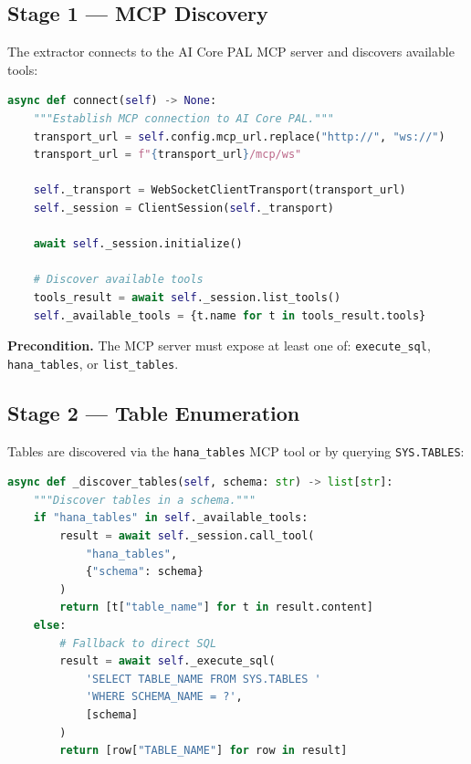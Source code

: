 \documentclass[11pt,a4paper]{article}
\begin{document}
\subsection{Stage 1 --- MCP Discovery}

The extractor connects to the AI Core PAL MCP server and discovers available tools:

\begin{lstlisting}[language=Python,caption={MCP connection (hana\_schema\_extractor.py, lines 45--60)}]
async def connect(self) -> None:
    """Establish MCP connection to AI Core PAL."""
    transport_url = self.config.mcp_url.replace("http://", "ws://")
    transport_url = f"{transport_url}/mcp/ws"
    
    self._transport = WebSocketClientTransport(transport_url)
    self._session = ClientSession(self._transport)
    
    await self._session.initialize()
    
    # Discover available tools
    tools_result = await self._session.list_tools()
    self._available_tools = {t.name for t in tools_result.tools}
\end{lstlisting}

\textbf{Precondition.} The MCP server must expose at least one of: \texttt{execute\_sql},
\texttt{hana\_tables}, or \texttt{list\_tables}.

\subsection{Stage 2 --- Table Enumeration}

Tables are discovered via the \texttt{hana\_tables} MCP tool or by querying
\texttt{SYS.TABLES}:

\begin{lstlisting}[language=Python,caption={Table discovery (hana\_schema\_extractor.py, lines 85--105)}]
async def _discover_tables(self, schema: str) -> list[str]:
    """Discover tables in a schema."""
    if "hana_tables" in self._available_tools:
        result = await self._session.call_tool(
            "hana_tables",
            {"schema": schema}
        )
        return [t["table_name"] for t in result.content]
    else:
        # Fallback to direct SQL
        result = await self._execute_sql(
            'SELECT TABLE_NAME FROM SYS.TABLES '
            'WHERE SCHEMA_NAME = ?',
            [schema]
        )
        return [row["TABLE_NAME"] for row in result]
\end{lstlisting}
\end{document}

